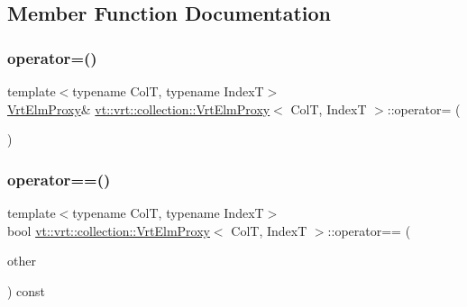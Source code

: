 \subsection{Member Function Documentation}
\mbox{\label{structvt_1_1vrt_1_1collection_1_1_vrt_elm_proxy_a74d7dc399b099347ebb01ece6a7ab025}} 
\subsubsection{\texorpdfstring{operator=()}{operator=()}}
{\footnotesize\ttfamily template$<$typename ColT, typename IndexT$>$ \\
\hyperlink{structvt_1_1vrt_1_1collection_1_1_vrt_elm_proxy}{Vrt\+Elm\+Proxy}\& \hyperlink{structvt_1_1vrt_1_1collection_1_1_vrt_elm_proxy}{vt\+::vrt\+::collection\+::\+Vrt\+Elm\+Proxy}$<$ ColT, IndexT $>$\+::operator= (\begin{DoxyParamCaption}\item[{\hyperlink{structvt_1_1vrt_1_1collection_1_1_vrt_elm_proxy}{Vrt\+Elm\+Proxy}$<$ ColT, IndexT $>$ const \&}]{ }\end{DoxyParamCaption})\hspace{0.3cm}{\ttfamily [default]}}

\mbox{\label{structvt_1_1vrt_1_1collection_1_1_vrt_elm_proxy_aaa0d1284499b6714cc4462ecc03580bb}} 
\subsubsection{\texorpdfstring{operator==()}{operator==()}}
{\footnotesize\ttfamily template$<$typename ColT, typename IndexT$>$ \\
bool \hyperlink{structvt_1_1vrt_1_1collection_1_1_vrt_elm_proxy}{vt\+::vrt\+::collection\+::\+Vrt\+Elm\+Proxy}$<$ ColT, IndexT $>$\+::operator== (\begin{DoxyParamCaption}\item[{\hyperlink{structvt_1_1vrt_1_1collection_1_1_vrt_elm_proxy}{Vrt\+Elm\+Proxy}$<$ ColT, IndexT $>$ const \&}]{other }\end{DoxyParamCaption}) const\hspace{0.3cm}{\ttfamily [inline]}}

